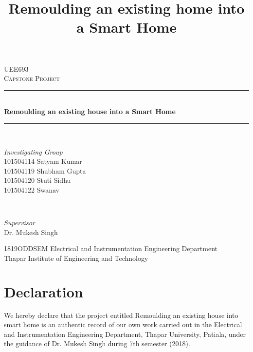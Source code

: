 \documentclass[12pt,a4paper,titlepage,twoside]{article}
\title{Remoulding an existing home into a Smart Home}
\begin{document}
        \begin{titlepage} 
            \newcommand{\HRule}{\rule{\linewidth}{0.5mm}}
            \centering 
            \textsc{\Large UEE693}\\[0.5cm] 
            \textsc{\large Capstone Project}\\[0.5cm]
            \HRule\\[0.4cm]
            {\huge\bfseries Remoulding an existing house into a Smart Home}\\[0.4cm]
            \HRule\\[1.5cm]
            \begin{minipage}{0.5\textwidth}
                \begin{flushleft}
                    \large
                    \textit{Investigating Group}\\[0.25cm]
                    101504114 Satyam Kumar\\
                    101504119 Shubham Gupta\\
                    101504120 Stuti Sidhu\\
                    101504122 Swanav\\
                \end{flushleft}
            \end{minipage}
            ~
            \begin{minipage}{0.4\textwidth}
                \begin{flushright}
                    \large
                    \textit{Supervisor}\\
                    Dr. Mukesh Singh
                \end{flushright}
            \end{minipage}
            \vfill\vfill\vfill
            {\large 1819ODDSEM}		
            \vfill\vfill
            Electrical and Instrumentation Engineering Department\\
            Thapar Institute of Engineering and Technology
        \end{titlepage}
    
        \tableofcontents
        \newpage
    	\section{Declaration}
    	We hereby declare that the project entitled Remoulding an existing house into smart home is an authentic record of our own work carried out in the Electrical and Instrumentation Engineering Department, Thapar University, Patiala, under the guidance of Dr. Mukesh Singh during 7th semester (2018).\\
    	
\end{document}
